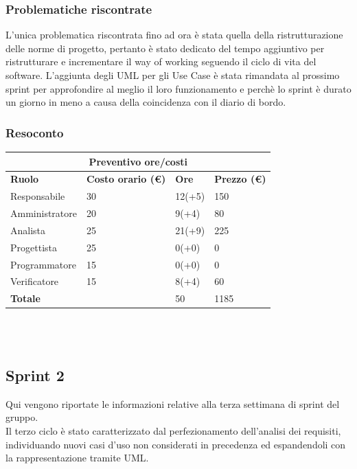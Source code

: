\documentclass[10pt]{article}
\begin{document}
\subsubsection{Problematiche riscontrate}
L'unica problematica riscontrata fino ad ora è stata quella della ristrutturazione delle norme di progetto, pertanto è stato dedicato del tempo aggiuntivo per ristrutturare e incrementare il way of working seguendo il ciclo di vita del software.
L'aggiunta degli UML per gli Use Case è stata rimandata al prossimo sprint per approfondire al meglio il loro funzionamento e perchè lo sprint è durato un giorno in meno a causa della coincidenza con il diario di bordo.
\subsubsection{Resoconto}
\begin{center}
	\begin{tabularx}{\textwidth}{|X|X|X|X|}
		\hline
		\multicolumn{4}{|c|}{\textbf{Preventivo ore/costi}}                                      \\
		\hline
		\hline
		\textbf{Ruolo}  & \textbf{Costo orario (\euro)} & \textbf{Ore} & \textbf{Prezzo (\euro)} \\
		\hline
		Responsabile    & 30                            & 12(+5)       & 150                     \\
		\hline
		Amministratore  & 20                            & 9(+4)        & 80                      \\
		\hline
		Analista        & 25                            & 21(+9)       & 225                     \\
		\hline
		Progettista     & 25                            & 0(+0)        & 0                       \\
		\hline
		Programmatore   & 15                            & 0(+0)        & 0                       \\
		\hline
		Verificatore    & 15                            & 8(+4)        & 60                      \\
		\hline
		\hline
		\textbf{Totale} &                               & 50           & 1185                    \\
		\hline
	\end{tabularx}\\[8pt]
	\mbox{}\\
\end{center}


\subsection{Sprint 2}
Qui vengono riportate le informazioni relative alla terza settimana di sprint del gruppo. \\
Il terzo ciclo è stato caratterizzato dal perfezionamento dell'analisi dei requisiti, individuando nuovi casi d'uso non considerati in precedenza ed espandendoli con la rappresentazione tramite UML.\\
\end{document}
